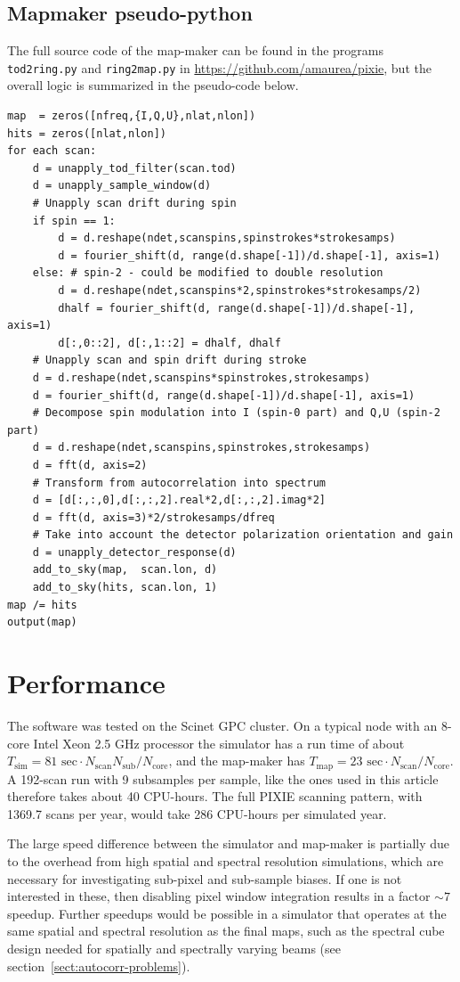 \documentclass{article}
\begin{document}
\subsection{Mapmaker pseudo-python}
\label{sect:mapmaker}
The full source code of the map-maker can be found in the
programs \texttt{tod2ring.py} and \texttt{ring2map.py} in
\url{https://github.com/amaurea/pixie}, but the overall logic is summarized in
the pseudo-code below.
\begin{lstlisting}
map  = zeros([nfreq,{I,Q,U},nlat,nlon])
hits = zeros([nlat,nlon])
for each scan:
	d = unapply_tod_filter(scan.tod)
	d = unapply_sample_window(d)
	# Unapply scan drift during spin
	if spin == 1:
		d = d.reshape(ndet,scanspins,spinstrokes*strokesamps)
		d = fourier_shift(d, range(d.shape[-1])/d.shape[-1], axis=1)
	else: # spin-2 - could be modified to double resolution
		d = d.reshape(ndet,scanspins*2,spinstrokes*strokesamps/2)
		dhalf = fourier_shift(d, range(d.shape[-1])/d.shape[-1], axis=1)
		d[:,0::2], d[:,1::2] = dhalf, dhalf
	# Unapply scan and spin drift during stroke
	d = d.reshape(ndet,scanspins*spinstrokes,strokesamps)
	d = fourier_shift(d, range(d.shape[-1])/d.shape[-1], axis=1)
	# Decompose spin modulation into I (spin-0 part) and Q,U (spin-2 part)
	d = d.reshape(ndet,scanspins,spinstrokes,strokesamps)
	d = fft(d, axis=2)
	# Transform from autocorrelation into spectrum
	d = [d[:,:,0],d[:,:,2].real*2,d[:,:,2].imag*2]
	d = fft(d, axis=3)*2/strokesamps/dfreq
	# Take into account the detector polarization orientation and gain
	d = unapply_detector_response(d)
	add_to_sky(map,  scan.lon, d)
	add_to_sky(hits, scan.lon, 1)
map /= hits
output(map)
\end{lstlisting}

\section{Performance}
The software was tested on the Scinet GPC cluster. On a typical node
with an 8-core Intel Xeon 2.5 GHz processor the simulator has a run time of
about $T_\textrm{sim} = 81 \textrm{ sec} \cdot N_\textrm{scan} N_\textrm{sub} / N_\textrm{core}$,
and the map-maker has $T_\textrm{map} = 23 \textrm{ sec} \cdot N_\textrm{scan} / N_\textrm{core}$.
A 192-scan run with 9 subsamples per sample, like the ones used in this article
therefore takes about 40 CPU-hours. The full PIXIE scanning pattern, with 1369.7 scans
per year, would take 286 CPU-hours per simulated year.

The large speed difference between the simulator and map-maker is partially due to
the overhead from high spatial and spectral resolution simulations, which are necessary
for investigating sub-pixel and sub-sample biases. If one is not interested in
these, then disabling pixel window integration results in a factor $\sim 7$ speedup.
Further speedups would be possible in a simulator that operates at the same spatial
and spectral resolution as the final maps, such as the spectral cube design needed
for spatially and spectrally varying beams (see section~\ref{sect:autocorr-problems}).
\end{document}
